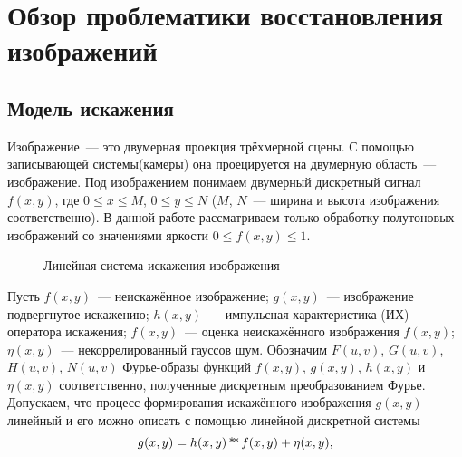 \chapter{Обзор проблематики восстановления изображений}
\section{Модель искажения}\label{seqtion:distortionModel}
Изображение~--- это двумерная проекция трёхмерной сцены. С помощью записывающей системы(камеры) она проецируется на двумерную область~--- изображение. Под изображением понимаем двумерный дискретный сигнал $f(x,y)$, где $0\leq x \leq M$, $0\leq y\leq N$ ($M$, $N$~--- ширина и высота изображения соответственно). В данной работе рассматриваем только обработку полутоновых изображений со значениями яркости $0\leq f(x,y)\leq 1$.

\begin{figure}[h!]
    \centering
    \caption{Линейная система искажения изображения}
    \label{fig:distortionScheme}
\end{figure}

Пусть $f(x,y)$~--- неискажённое изображение; $g(x,y)$~--- изображение подвергнутое искажению; $h(x,y)$~--- импульсная характеристика (ИХ) оператора искажения; $\hat{f}(x,y)$~--- оценка неискажённого изображения $f(x,y)$; $\eta(x,y)$~--- некоррелированный гауссов шум. Обозначим $F(u,v)$, $G(u,v)$, $H(u,v)$, $N(u,v)$ Фурье-образы функций $f(x,y)$, $g(x,y)$, $h(x,y)$ и $\eta(x,y)$ соответственно, полученные дискретным преобразованием Фурье\cite[стр.~332]{gonsalesDigital2012}.
Допускаем, что процесс формирования искажённого изображения $g(x, y)$ линейный и его можно описать с помощью линейной дискретной системы \cite[стр.~403]{gonsalesDigital2012}
\begin{equation}\label{eq:distortion}
g(x, y) = h(x,y) \operatorname*{*\!*} f(x,y) + \eta(x,y),
\end{equation}

